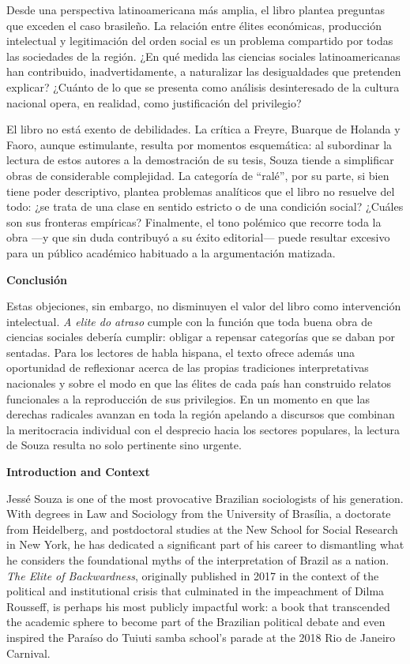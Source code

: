 \documentclass{article}
\begin{document}
Desde una perspectiva latinoamericana más amplia, el libro plantea preguntas que exceden el caso brasileño. La relación entre élites económicas, producción intelectual y legitimación del orden social es un problema compartido por todas las sociedades de la región. ¿En qué medida las ciencias sociales latinoamericanas han contribuido, inadvertidamente, a naturalizar las desigualdades que pretenden explicar? ¿Cuánto de lo que se presenta como análisis desinteresado de la cultura nacional opera, en realidad, como justificación del privilegio?

El libro no está exento de debilidades. La crítica a Freyre, Buarque de Holanda y Faoro, aunque estimulante, resulta por momentos esquemática: al subordinar la lectura de estos autores a la demostración de su tesis, Souza tiende a simplificar obras de considerable complejidad. La categoría de “ralé”, por su parte, si bien tiene poder descriptivo, plantea problemas analíticos que el libro no resuelve del todo: ¿se trata de una clase en sentido estricto o de una condición social? ¿Cuáles son sus fronteras empíricas? Finalmente, el tono polémico que recorre toda la obra —y que sin duda contribuyó a su éxito editorial— puede resultar excesivo para un público académico habituado a la argumentación matizada.

\textbf{Conclusión}

Estas objeciones, sin embargo, no disminuyen el valor del libro como intervención intelectual. \textit{A elite do atraso} cumple con la función que toda buena obra de ciencias sociales debería cumplir: obligar a repensar categorías que se daban por sentadas. Para los lectores de habla hispana, el texto ofrece además una oportunidad de reflexionar acerca de las propias tradiciones interpretativas nacionales y sobre el modo en que las élites de cada país han construido relatos funcionales a la reproducción de sus privilegios. En un momento en que las derechas radicales avanzan en toda la región apelando a discursos que combinan la meritocracia individual con el desprecio hacia los sectores populares, la lectura de Souza resulta no solo pertinente sino urgente.

\textbf{Introduction and Context}

Jessé Souza is one of the most provocative Brazilian sociologists of his generation. With degrees in Law and Sociology from the University of Brasília, a doctorate from Heidelberg, and postdoctoral studies at the New School for Social Research in New York, he has dedicated a significant part of his career to dismantling what he considers the foundational myths of the interpretation of Brazil as a nation. \textit{The Elite of Backwardness}, originally published in 2017 in the context of the political and institutional crisis that culminated in the impeachment of Dilma Rousseff, is perhaps his most publicly impactful work: a book that transcended the academic sphere to become part of the Brazilian political debate and even inspired the Paraíso do Tuiuti samba school’s parade at the 2018 Rio de Janeiro Carnival.
\end{document}
